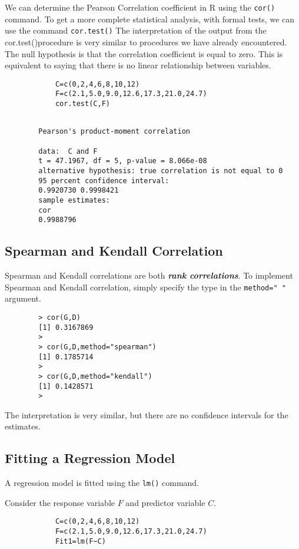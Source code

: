 \documentclass[a4paper,12pt]{article}
\begin{document}
\begin{itemize}
\begin{itemize}
		We can determine the Pearson Correlation coefficient in R using the \texttt{cor()} command.
		To get a more complete statistical analysis, with formal tests, we can use the command \texttt{cor.test()}
		The interpretation of the output from the cor.test()procedure is very similar to procedures we have already encountered. The null hypothesis is that the correlation coefficient is equal to zero. This is equivalent to saying that there is no linear relationship between variables.
		
		
		\begin{framed}
			\begin{verbatim}
			C=c(0,2,4,6,8,10,12) 
			F=c(2.1,5.0,9.0,12.6,17.3,21.0,24.7)
			cor.test(C,F)
			\end{verbatim}
		\end{framed}
		\begin{verbatim}
		
		Pearson's product-moment correlation
		
		data:  C and F 
		t = 47.1967, df = 5, p-value = 8.066e-08
		alternative hypothesis: true correlation is not equal to 0 
		95 percent confidence interval:
		0.9920730 0.9998421 
		sample estimates:
		cor 
		0.9988796 
		\end{verbatim}
		
		
		\subsection{Spearman and Kendall Correlation}
		Spearman and Kendall correlations are both \textbf{\emph{rank correlations}}. 
		To implement Spearman and Kendall correlation, simply specify the type in the \texttt{method=" "} argument.
		\begin{verbatim}
		> cor(G,D)
		[1] 0.3167869
		>
		> cor(G,D,method="spearman")
		[1] 0.1785714
		>
		> cor(G,D,method="kendall")
		[1] 0.1428571
		> 
		\end{verbatim}
		The interpretation is very similar, but there are no confidence intervals for the estimates.
		
		\subsection{Fitting a Regression Model}
		A regression model is fitted using the \texttt{lm()} command.
		
		Consider the response variable $F$ and predictor variable $C$.
		\begin{framed}
			\begin{verbatim}
			C=c(0,2,4,6,8,10,12) 
			F=c(2.1,5.0,9.0,12.6,17.3,21.0,24.7)
			Fit1=lm(F~C)
			\end{verbatim}
		\end{framed}
		

\end{itemize}
\end{itemize}
\end{document}
